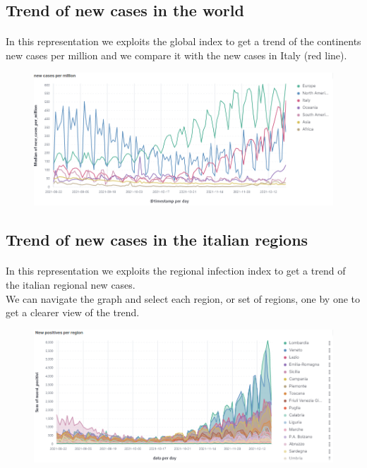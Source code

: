 \documentclass[a4paper,12pt]{article}
\begin{document}
\subsection{Trend of new cases in the world}

\paragraph{}In this representation we exploits the global index to get a trend of the continents new cases per million and we compare it with the new cases in Italy (red line).
\begin{figure}[h]
	\centering
  \includegraphics[width=\linewidth]{dashboards/dash6.png}
\end{figure}

\subsection{Trend of new cases in the italian regions}
\paragraph{}In this representation we exploits the regional infection index to get a trend of the italian regional new cases. \\ We can navigate the graph and select each region, or set of regions, one by one to get a clearer view of the trend.
\begin{figure}[h]
	\centering
  \includegraphics[width=\linewidth]{dashboards/dash7.png}
\end{figure}
\end{document}
